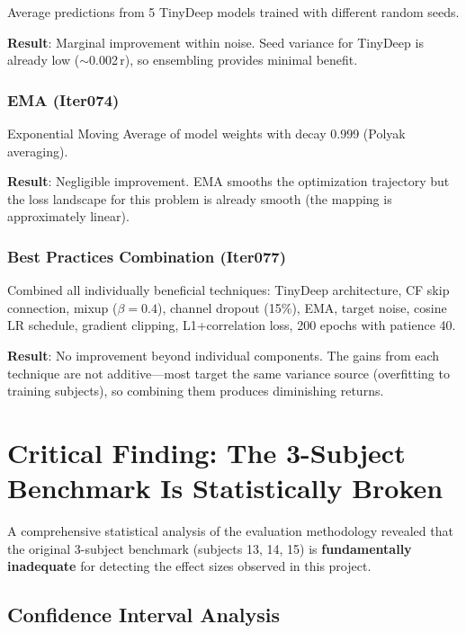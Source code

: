 \documentclass[11pt,a4paper]{article}
\begin{document}
Average predictions from 5 TinyDeep models trained with different random
seeds.

\textbf{Result}: Marginal improvement within noise. Seed variance for
TinyDeep is already low ($\sim$0.002\,r), so ensembling provides minimal
benefit.

\subsubsection{EMA (Iter074)}

Exponential Moving Average of model weights with decay 0.999 (Polyak
averaging).

\textbf{Result}: Negligible improvement. EMA smooths the optimization
trajectory but the loss landscape for this problem is already smooth
(the mapping is approximately linear).

\subsubsection{Best Practices Combination (Iter077)}

Combined all individually beneficial techniques: TinyDeep architecture,
CF skip connection, mixup ($\beta = 0.4$), channel dropout (15\%), EMA,
target noise, cosine LR schedule, gradient clipping, L1+correlation loss,
200 epochs with patience 40.

\textbf{Result}: No improvement beyond individual components. The gains
from each technique are not additive---most target the same variance
source (overfitting to training subjects), so combining them produces
diminishing returns.

\section{Critical Finding: The 3-Subject Benchmark Is Statistically Broken}
\label{sec:statistics}

A comprehensive statistical analysis of the evaluation methodology revealed
that the original 3-subject benchmark (subjects 13, 14, 15) is
\textbf{fundamentally inadequate} for detecting the effect sizes observed
in this project.

\subsection{Confidence Interval Analysis}
\end{document}
